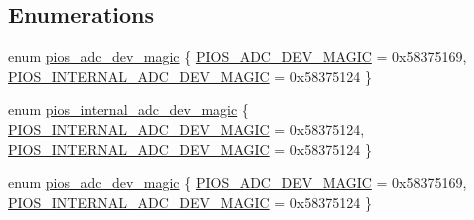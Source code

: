 \subsection*{\-Enumerations}
\begin{DoxyCompactItemize}
\item 
enum \hyperlink{group___p_i_o_s___a_d_c_gad4639b786d45b213ac842a0c4cf3e78d}{pios\-\_\-adc\-\_\-dev\-\_\-magic} \{ \hyperlink{group___p_i_o_s___a_d_c_ggad4639b786d45b213ac842a0c4cf3e78dab432edba8e4a3348b2f28cf7edf94f79}{\-P\-I\-O\-S\-\_\-\-A\-D\-C\-\_\-\-D\-E\-V\-\_\-\-M\-A\-G\-I\-C} =  0x58375169, 
\hyperlink{group___p_i_o_s___a_d_c_ggad4639b786d45b213ac842a0c4cf3e78dadc16fac7b3b7f2cbaf50a1224b2bbba2}{\-P\-I\-O\-S\-\_\-\-I\-N\-T\-E\-R\-N\-A\-L\-\_\-\-A\-D\-C\-\_\-\-D\-E\-V\-\_\-\-M\-A\-G\-I\-C} =  0x58375124
 \}
\item 
enum \hyperlink{group___p_i_o_s___a_d_c_gafcbb2d879978c3e1679c3ccabaff8c03}{pios\-\_\-internal\-\_\-adc\-\_\-dev\-\_\-magic} \{ \hyperlink{group___p_i_o_s___a_d_c_ggafcbb2d879978c3e1679c3ccabaff8c03adc16fac7b3b7f2cbaf50a1224b2bbba2}{\-P\-I\-O\-S\-\_\-\-I\-N\-T\-E\-R\-N\-A\-L\-\_\-\-A\-D\-C\-\_\-\-D\-E\-V\-\_\-\-M\-A\-G\-I\-C} =  0x58375124, 
\hyperlink{group___p_i_o_s___a_d_c_ggafcbb2d879978c3e1679c3ccabaff8c03adc16fac7b3b7f2cbaf50a1224b2bbba2}{\-P\-I\-O\-S\-\_\-\-I\-N\-T\-E\-R\-N\-A\-L\-\_\-\-A\-D\-C\-\_\-\-D\-E\-V\-\_\-\-M\-A\-G\-I\-C} =  0x58375124
 \}
\item 
enum \hyperlink{group___p_i_o_s___a_d_c_gad4639b786d45b213ac842a0c4cf3e78d}{pios\-\_\-adc\-\_\-dev\-\_\-magic} \{ \hyperlink{group___p_i_o_s___a_d_c_ggad4639b786d45b213ac842a0c4cf3e78dab432edba8e4a3348b2f28cf7edf94f79}{\-P\-I\-O\-S\-\_\-\-A\-D\-C\-\_\-\-D\-E\-V\-\_\-\-M\-A\-G\-I\-C} =  0x58375169, 
\hyperlink{group___p_i_o_s___a_d_c_ggad4639b786d45b213ac842a0c4cf3e78dadc16fac7b3b7f2cbaf50a1224b2bbba2}{\-P\-I\-O\-S\-\_\-\-I\-N\-T\-E\-R\-N\-A\-L\-\_\-\-A\-D\-C\-\_\-\-D\-E\-V\-\_\-\-M\-A\-G\-I\-C} =  0x58375124
 \}
\end{DoxyCompactItemize}
